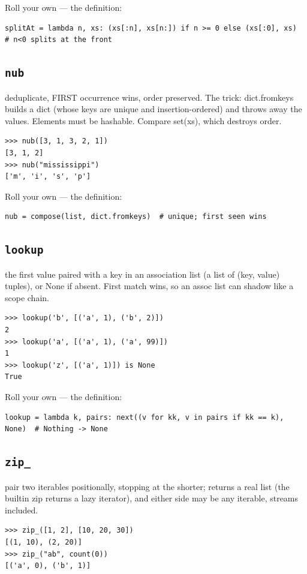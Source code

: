 \documentclass[10pt,letterpaper]{book}
\begin{document}
Roll your own --- the definition:

\begin{lstlisting}[style=ex]
splitAt = lambda n, xs: (xs[:n], xs[n:]) if n >= 0 else (xs[:0], xs)  # n<0 splits at the front
\end{lstlisting}
\subsection{\texttt{nub}}\label{def:nub}
deduplicate, FIRST occurrence wins, order preserved. The trick: dict.fromkeys builds a dict (whose keys are unique and insertion-ordered) and throws away the values. Elements must be hashable. Compare set(xs), which destroys order.
\begin{lstlisting}[style=ex]
>>> nub([3, 1, 3, 2, 1])
[3, 1, 2]
>>> nub("mississippi")
['m', 'i', 's', 'p']
\end{lstlisting}

Roll your own --- the definition:

\begin{lstlisting}[style=ex]
nub = compose(list, dict.fromkeys)  # unique; first seen wins
\end{lstlisting}

\subsection{\texttt{lookup}}\label{def:lookup}
the first value paired with a key in an association list (a list of (key, value) tuples), or None if absent. First match wins, so an assoc list can shadow like a scope chain.
\begin{lstlisting}[style=ex]
>>> lookup('b', [('a', 1), ('b', 2)])
2
>>> lookup('a', [('a', 1), ('a', 99)])
1
>>> lookup('z', [('a', 1)]) is None
True
\end{lstlisting}

Roll your own --- the definition:

\begin{lstlisting}[style=ex]
lookup = lambda k, pairs: next((v for kk, v in pairs if kk == k), None)  # Nothing -> None
\end{lstlisting}
\subsection{\texttt{zip\_}}\label{def:zip-}
pair two iterables positionally, stopping at the shorter; returns a real list (the builtin zip returns a lazy iterator), and either side may be any iterable, streams included.
\begin{lstlisting}[style=ex]
>>> zip_([1, 2], [10, 20, 30])
[(1, 10), (2, 20)]
>>> zip_("ab", count(0))
[('a', 0), ('b', 1)]
\end{lstlisting}
\end{document}

